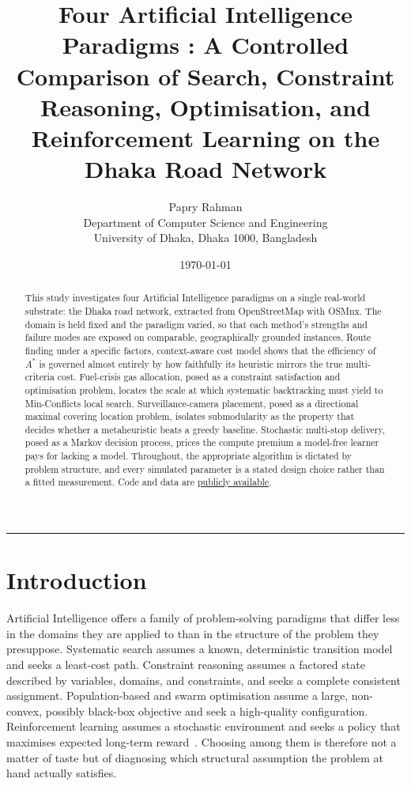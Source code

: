 \documentclass{ai-lab-report}
\title{Four Artificial Intelligence Paradigms : A Controlled Comparison of Search, Constraint Reasoning, Optimisation, and Reinforcement Learning on the Dhaka Road Network}
\author{Papry Rahman\\[0.25em]\normalsize Department of Computer Science and Engineering\\[0.1em]\normalsize University of Dhaka, Dhaka 1000, Bangladesh}
\date{\today}
\begin{document}
\maketitle

\begin{abstract}
This study investigates four Artificial Intelligence paradigms on a
single real-world substrate: the Dhaka road network, extracted from
OpenStreetMap with OSMnx. The domain is
held fixed and the paradigm varied, so that each method's strengths
and failure modes are exposed on comparable, geographically
grounded instances. Route finding under a specific factors,
context-aware cost model shows that the efficiency of $A^{*}$ is
governed almost entirely by how faithfully its heuristic mirrors
the true multi-criteria cost. Fuel-crisis gas allocation, posed as
a constraint satisfaction and optimisation problem, locates the
scale at which systematic backtracking must yield to Min-Conflicts
local search. Surveillance-camera placement, posed as a directional
maximal covering location problem, isolates submodularity as the
property that decides whether a metaheuristic beats a greedy
baseline. Stochastic multi-stop delivery, posed as a Markov
decision process, prices the compute premium a model-free learner
pays for lacking a model. Throughout, the appropriate algorithm is
dictated by problem structure, and every simulated parameter is a
stated design choice rather than a fitted measurement. Code and data are
\href{https://github.com/Ardent-ashes/dhaka-ai-paradigms}{publicly
available}.
\end{abstract}


\vspace{2mm}\noindent\rule{\textwidth}{0.4pt}\vspace{2mm}

\section{Introduction}
Artificial Intelligence offers a family of problem-solving
paradigms that differ less in the domains they are applied to than
in the structure of the problem they presuppose. Systematic search
assumes a known, deterministic transition model and seeks a
least-cost path. Constraint reasoning assumes a factored state
described by variables, domains, and constraints, and seeks a
complete consistent assignment. Population-based and swarm
optimisation assume a large, non-convex, possibly black-box
objective and seek a high-quality configuration. Reinforcement
learning assumes a stochastic environment and seeks a policy that
maximises expected long-term reward~\cite{russell2021ai}. Choosing
among them is therefore not a matter of taste but of diagnosing
which structural assumption the problem at hand actually satisfies.
\end{document}

